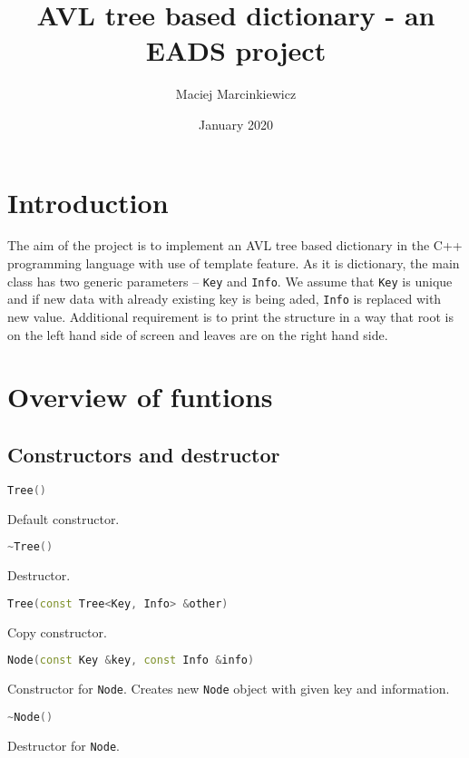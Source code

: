 \documentclass{article}
\title{AVL tree based dictionary - an EADS project}
\author{Maciej Marcinkiewicz}
\date{January 2020}
\begin{document}
\maketitle

\section{Introduction}

The aim of the project is to implement an AVL tree based dictionary in the C++ programming
language with use of template feature. As it is dictionary, the main class has two 
generic parameters – {\tt Key} and {\tt Info}. We assume that {\tt Key} is unique
and if new data with already existing key is being aded, {\tt Info} is replaced with new
value. Additional requirement is to print the structure in a way that root is on the left
hand side of screen and leaves are on the right hand side.

\section{Overview of funtions}

\subsection{Constructors and destructor}

\begin{lstlisting}[language=C++]
Tree()
\end{lstlisting}
Default constructor.

\begin{lstlisting}[language=C++]
~Tree()
\end{lstlisting}
Destructor.

\begin{lstlisting}[language=C++]
Tree(const Tree<Key, Info> &other)
\end{lstlisting}
Copy constructor.

\begin{lstlisting}[language=C++]
Node(const Key &key, const Info &info)
\end{lstlisting}
Constructor for {\tt Node}. Creates new {\tt Node} object with given key and information.

\begin{lstlisting}[language=C++]
~Node()
\end{lstlisting}
Destructor for {\tt Node}.

\vspace{\baselineskip}
\end{document}
